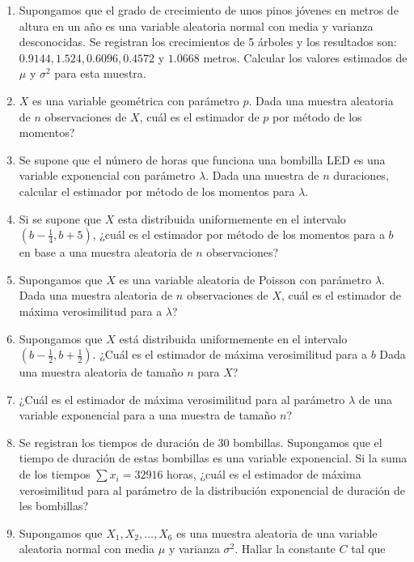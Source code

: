 \documentclass[]{article}
\begin{document}
\begin{enumerate}
\def\labelenumi{\arabic{enumi}.}
\setcounter{enumi}{1}
\item
  Supongamos que el grado de crecimiento de unos pinos jóvenes en metros
  de altura en un año es una variable aleatoria normal con media y
  varianza desconocidas. Se registran los crecimientos de 5 árboles y
  los resultados son: \(0.9144,1.524,0.6096,0.4572\) y \(1.0668\)
  metros. Calcular los valores estimados de \(\mu\) y \(\sigma^2\) para
  esta muestra.
\item
  \(X\) es una variable geométrica con parámetro \(p\). Dada una muestra
  aleatoria de \(n\) observaciones de \(X\), cuál es el estimador de
  \(p\) por método de los momentos?
\item
  Se supone que el número de horas que funciona una bombilla LED es una
  variable exponencial con parámetro \(\lambda\). Dada una muestra de
  \(n\) duraciones, calcular el estimador por método de los momentos
  para \(\lambda\).
\item
  Si se supone que \(X\) esta distribuida uniformemente en el intervalo
  \((b-\frac14,b+5)\), ¿cuál es el estimador por método de los momentos
  para a \(b\) en base a una muestra aleatoria de \(n\) observaciones?
\item
  Supongamos que \(X\) es una variable aleatoria de Poisson con
  parámetro \(\lambda\). Dada una muestra aleatoria de \(n\)
  observaciones de \(X\), cuál es el estimador de máxima verosimilitud
  para a \(\lambda\)?
\item
  Supongamos que \(X\) está distribuida uniformemente en el intervalo
  \hbox{$\left(b-\frac12,b+\frac12\right)$.} ¿Cuál es el estimador de
  máxima verosimilitud para a \(b\) Dada una muestra aleatoria de tamaño
  \(n\) para \(X\)?
\item
  ¿Cuál es el estimador de máxima verosimilitud para al parámetro
  \(\lambda\) de una variable exponencial para a una muestra de tamaño
  \(n\)?
\item
  Se registran los tiempos de duración de 30 bombillas. Supongamos que
  el tiempo de duración de estas bombillas es una variable exponencial.
  Si la suma de los tiempos \(\sum x_i =32916\) horas, ¿cuál es el
  estimador de máxima verosimilitud para al parámetro de la distribución
  exponencial de duración de les bombillas?
\item
  Supongamos que \(X_1,X_2,\ldots,X_6\) es una muestra aleatoria de una
  variable aleatoria normal con media \(\mu\) y varianza \(\sigma^2\).
  Hallar la constante \(C\) tal que

\end{enumerate}
\end{document}
